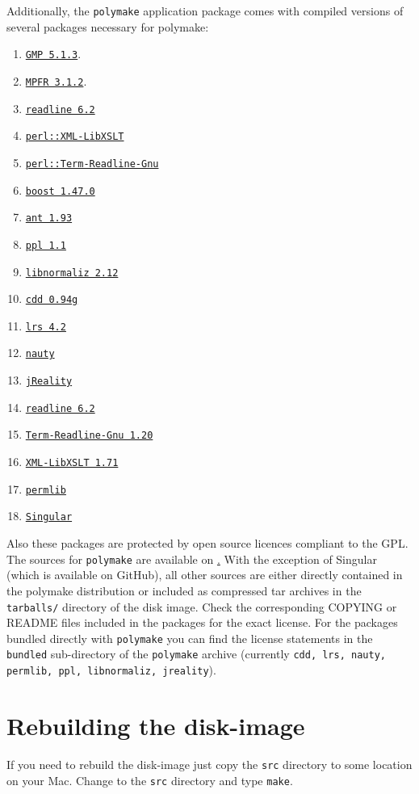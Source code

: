 \documentclass[a4paper]{amsart}
\newcommand{\polymake}{\texttt{polymake}\xspace}
\begin{document}
Additionally, the \polymake application package comes with compiled
versions of several packages necessary for polymake: 
\begin{enumerate}
\item \href{http://gmplib.org/}{\texttt{GMP 5.1.3}}.
\item \href{http://mpfr.org/}{\texttt{MPFR 3.1.2}}.
\item \href{http://tiswww.case.edu/php/chet/readline/rltop.html}{\texttt{readline 6.2}}
\item \href{http://search.cpan.org/dist/XML-LibXSLT/}{\texttt{perl::XML-LibXSLT}}
\item \href{http://search.cpan.org/dist/Term-ReadLine-Gnu/}{\texttt{perl::Term-Readline-Gnu}}
\item \href{http://www.boost.org/}{\texttt{boost 1.47.0}}
\item \href{http://ant.apache.org/}{\texttt{ant 1.93}}
\item \href{http://bugseng.com/products/ppl/}{\texttt{ppl 1.1}}
\item \href{http://www.home.uni-osnabrueck.de/wbruns/normaliz/}{\texttt{libnormaliz 2.12}}
\item \href{http://www.inf.ethz.ch/personal/fukudak/cdd_home/}{\texttt{cdd 0.94g}}
\item \href{http://cgm.cs.mcgill.ca/~avis/C/lrs.html}{\texttt{lrs 4.2}}
\item \href{http://cs.anu.edu.au/~bdm/nauty/}{\texttt{nauty}}
\item \href{http://www3.math.tu-berlin.de/jreality/}{\texttt{jReality}}
\item \href{http://cnswww.cns.cwru.edu/php/chet/readline/rltop.html}{\texttt{readline 6.2}}
\item \href{http://search.cpan.org/~hayashi/Term-ReadLine-Gnu-1.20/Gnu.pm}{\texttt{Term-Readline-Gnu 1.20}}
\item \href{http://search.cpan.org/~shlomif/XML-LibXSLT-1.87/LibXSLT.pm}{\texttt{XML-LibXSLT 1.71}}
\item \href{http://www.math.uni-rostock.de/~rehn/software/permlib.html}{\texttt{permlib}}
\item \href{https://github.com/Singular/Sources}{\texttt{Singular}}
\end{enumerate}
Also these packages are protected by open source licences compliant to
the GPL. The sources for \polymake are available on \href{http://polymake.org/doku.php/perpetualbeta}. With the exception of Singular (which is available on GitHub), all other sources are either directly contained in the 
polymake distribution or included as compressed tar archives in the
\texttt{tarballs/} directory of the disk image. Check the
corresponding COPYING or README files included in the packages for the
exact license.  For the packages bundled directly with \polymake you
can find the license statements in the \texttt{bundled} sub-directory
of the \polymake archive (currently \texttt{cdd, lrs, nauty, permlib, ppl, libnormaliz, jreality}).

\section*{Rebuilding the disk-image}

If you need to rebuild the disk-image just copy the \texttt{src}
directory to some location on your Mac. Change to the \texttt{src}
directory and type \texttt{make}.
\end{document}
